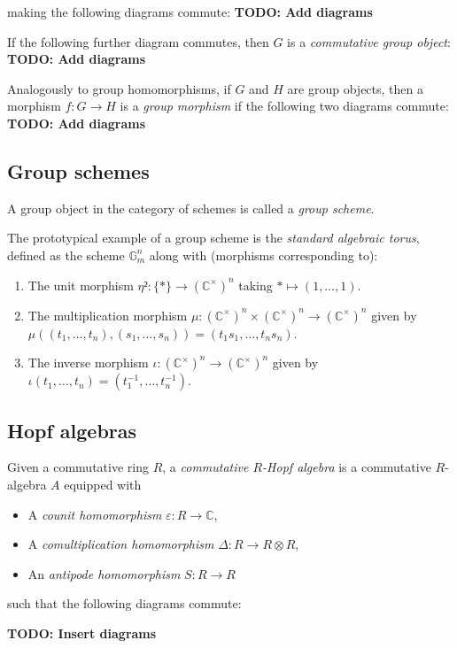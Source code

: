 \documentclass{article}
\begin{document}
making the following diagrams commute:
{\bf TODO: Add diagrams}

If the following further diagram commutes, then $G$ is a \emph{commutative group object}:
{\bf TODO: Add diagrams}

Analogously to group homomorphisms, if $G$ and $H$ are group objects,
then a morphism $f : G \to H$ is a \emph{group morphism} if the following two diagrams commute:
{\bf TODO: Add diagrams}


\subsection{Group schemes}


A group object in the category of schemes is called a \emph{group scheme}.

The prototypical example of a group scheme is the \emph{standard algebraic torus},
defined as the scheme $\mathbb G_m^n$ along with (morphisms corresponding to):
\begin{enumerate}
  \item The unit morphism $\eta ²: \{*\} \to (\mathbb C^\times)^n$ taking $* \mapsto (1, \dots, 1)$.
  \item The multiplication morphism $\mu : (\mathbb C^\times)^n \times (\mathbb C^\times)^n \to (\mathbb C^\times)^n$
  given by $\mu((t_1, \dots, t_n),(s_1, \dots, s_n)) = (t_1s_1, \dots, t_n s_n)$.
  \item The inverse morphism $\iota : (\mathbb C^\times)^n \to (\mathbb C^\times)^n$
  given by $\iota(t_1, \dots, t_n) = (t_1^{-1}, \dots, t_n^{-1})$.
\end{enumerate}


\subsection{Hopf algebras}


Given a commutative ring $R$, a \emph{commutative $R$-Hopf algebra}
is a commutative $R$-algebra $A$ equipped with
\begin{itemize}
  \item A \emph{counit homomorphism} $\varepsilon: R\to\mathbb{C}$,
  \item A \emph{comultiplication homomorphism} $\Delta: R \to R \otimes R$,
  \item An \emph{antipode homomorphism} $S: R \to R$
\end{itemize}
such that the following diagrams commute:

{\bf TODO: Insert diagrams}
\end{document}
